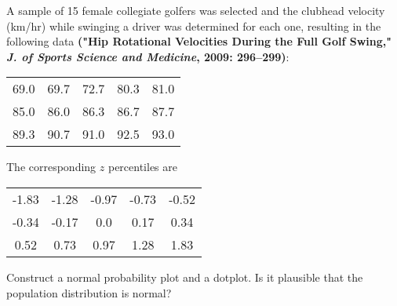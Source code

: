 \documentclass[11pt,letterpaper,boxed]{hmcpset}
\begin{document}

\begin{problem}[4.6.88]
	A sample of 15 female collegiate golfers was selected and the clubhead velocity (km/hr) while swinging a driver was determined for each one, resulting in the following data \textbf{("Hip Rotational Velocities During the Full Golf Swing," \emph{J. of Sports Science and Medicine}, 2009: 296--299)}:
	\begin{center}
	\begin{tabular}{c c c c c}
		69.0 & 69.7 & 72.7 & 80.3 & 81.0\\
		85.0 & 86.0 & 86.3 & 86.7 & 87.7\\
		89.3 & 90.7 & 91.0 & 92.5 & 93.0
	\end{tabular}
	\end{center}
	The corresponding $z$ percentiles are
	\begin{center}
	\begin{tabular}{c c c c c}
		-1.83 & -1.28 & -0.97 & -0.73 & -0.52\\
		-0.34 & -0.17 & 0.0 & 0.17 & 0.34\\
		0.52 & 0.73 & 0.97 & 1.28 & 1.83
	\end{tabular}
	\end{center}
Construct a normal probability plot and a dotplot. Is it plausible that the population distribution is normal?
\end{problem}

\begin{solution}
	\vfill
\end{solution}
\newpage


\end{document}
